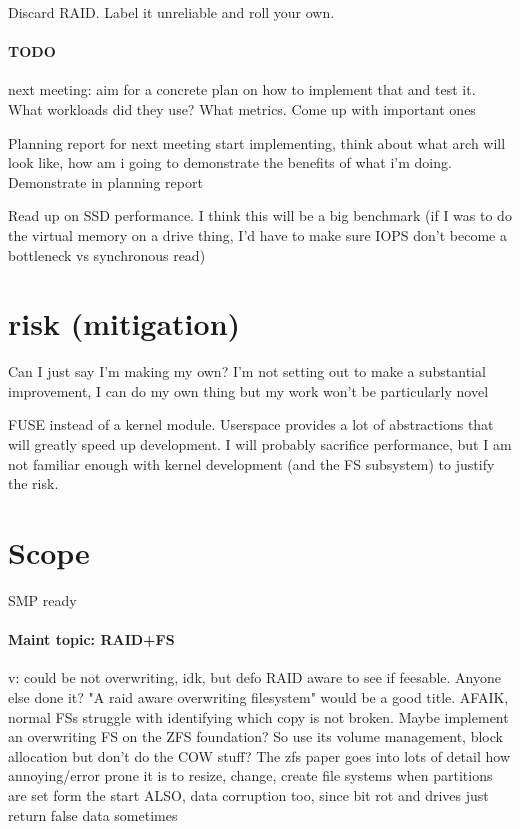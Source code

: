 \documentclass[a4paper]{report}
\begin{document}
        Discard RAID. Label it unreliable and roll your own.


        \paragraph{TODO} next meeting: aim for a concrete plan on how to implement that and
        test it. What workloads did they use? What metrics. Come up with important ones

        Planning report for next meeting
        start implementing, think about what arch will look like, how am i going to demonstrate the benefits of what i'm doing. Demonstrate in planning report

        Read up on SSD performance. I think this will be a big benchmark (if I
        was to do the virtual memory on a drive thing, I'd have to make sure
        IOPS don't become a bottleneck vs synchronous read)


    \section{risk (mitigation)}
        Can I just say I'm making my own? I'm not setting out to make a
        substantial improvement, I can do my own thing but my work won't be
        particularly novel

        FUSE instead of a kernel module. Userspace provides a lot of
        abstractions that will greatly speed up development. I will probably
        sacrifice performance, but I am not familiar enough with kernel
        development (and the FS subsystem) to justify the risk.

    \section{Scope}
        SMP ready

        \paragraph{Maint topic: RAID+FS}
        v: could be not overwriting, idk, but defo RAID aware to see if feesable. Anyone else done it?
        "A raid aware overwriting filesystem" would be a good title. AFAIK,
        normal FSs struggle with identifying which copy is not broken. Maybe
        implement an overwriting FS on the ZFS foundation? So use its volume
        management, block allocation but don't do the COW stuff? The zfs paper
        goes into lots of detail how annoying/error prone it is to resize,
        change, create file systems when partitions are set form the start
        ALSO, data corruption too, since bit rot and drives just return false data sometimes
\end{document}
